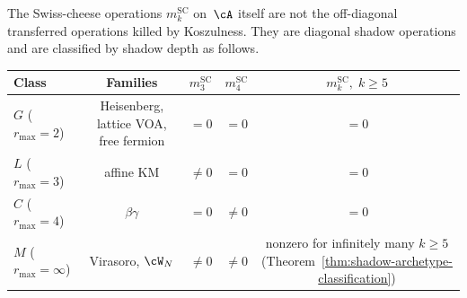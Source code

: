 \begin{proposition}
\label{prop:swiss-cheese-nonformality-by-class}
The Swiss-cheese operations $m_k^{\mathrm{SC}}$ on~$\cA$ itself are
not the off-diagonal transferred operations killed by Koszulness.
They are diagonal shadow operations and are classified by shadow depth
as follows.
\begin{center}
\renewcommand{\arraystretch}{1.3}
\begin{tabular}{@{}lcccc@{}}
\toprule
\textbf{Class}
& \textbf{Families}
& $m_3^{\mathrm{SC}}$
& $m_4^{\mathrm{SC}}$
& $m_k^{\mathrm{SC}},\; k \geq 5$ \\
\midrule
$G$ \textup{(}$r_{\max}=2$\textup{)}
& Heisenberg, lattice VOA, free fermion
& $= 0$
& $= 0$
& $= 0$ \\
$L$ \textup{(}$r_{\max}=3$\textup{)}
& affine KM
& $\neq 0$
& $= 0$
& $= 0$ \\
$C$ \textup{(}$r_{\max}=4$\textup{)}
& $\beta\gamma$
& $= 0$
& $\neq 0$
& $= 0$ \\
$M$ \textup{(}$r_{\max}=\infty$\textup{)}
& Virasoro, $\cW_N$
& $\neq 0$
& $\neq 0$
& nonzero for infinitely many $k \geq 5$
 \textup{(}Theorem~\ref{thm:shadow-archetype-classification}\textup{)} \\
\bottomrule
\end{tabular}
\end{center}


\end{proposition}
